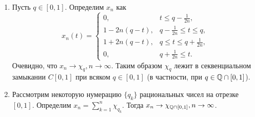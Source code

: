 \begin{solve}
\begin{enumerate}
        Покажем плотность $Q_n$ в $[0, 1]$ при каждом $n \in \N$. Пусть $Q_n$ -- не плотно. Тогда существует такой интервал $(a, b) \subset [0, 1]$, что $(a, b) \cap Q_n = \emptyset \Longleftrightarrow \forall m \in \N\colon \Int P_{m, n} \cap (a, b) = \emptyset$.

        Рассмотрим следующие множества:
        \[
            A_{m, n} = \bigcap_{k,j\geq m}\{t \in [0, 1] \mid |x_j(t) - x_k(t)| \leq \frac{1}{n}\}  .
        \]
        Заметим, что каждое $A_{m, n}$ -- замкнуто как пересечение замкнутых (которые замкнуты в силу непрерывности $x_m$). Так как $x_m \rightarrow x, m \rightarrow \infty$, то последовательность $\{x_m\}$ -- фундаментальна и $\forall t \in [0, 1] \  \exists m \in \N\colon \forall k,j \geq m \hookrightarrow |x_j(t) - x_k(t)| \leq \frac{1}{n}$. Тогда
        \[
            [0, 1] = \bigcup_{m = 1}^{\infty} A_{m, n}.
        \]
        Также, если $t \in A_{m, n}$, то в силу поточечной сходимости $\frac{1}{n} \geq |x_j(t) - x_k(t)| \rightarrow |x_j(t) - x(t)|$ при $j \geq m$, а значит $t \in P_{m, n}$. Тогда  $\Int A_{m, n} \subset \Int P_{m, n}$.

        Значит $\forall m \in \N\colon \Int A_{m, n} \cap (a, b) = \emptyset$. В частности, если $[c, d] \subset (a, b)$ и $c \neq d$, то
        \[
            [c, d] = \bigcup_{m = 1}^{\infty} A_{m, n} \cap [c, d].
        \]
        Но $A_{m, n}$ -- замкнутые множества, не имеющие внутренности в $[c, d]$, а следовательно мы получили представление полного метрического пространства в виде счётного объединения нигде не плотных множеств -- противоречие. Следовательно, каждое $Q_n$ -- всюду плотно, а следовательно и $R$ всюду плотно, что и требовалось доказать.

        \item Пусть $q \in [0, 1]$. Определим $x_n$ как
        \[
            x_n(t) =
            \begin{cases}
                0,  & t \leq q - \frac{1}{2n}, \\
                1 - 2n(q - t), & q - \frac{1}{2n} \leq t \leq q, \\
                1 + 2n(q - t), & q \leq t \leq q + \frac{1}{2n}, \\
                0, & q + \frac{1}{2n} \leq t.
            \end{cases}
        \]
        Очевидно, что $x_n \rightarrow \chi_{q}, n \rightarrow \infty$. Таким образом $\chi_{q}$ лежит в секвенциальном замыкании $C[0, 1]$ при всяком $q \in [0, 1]$ (в частности, при $q \in \mathbb{Q} \cap [0, 1]$).
        \item Рассмотрим некоторую нумерацию $\{q_k\}$ рациональных чисел на отрезке $[0, 1]$. Определим $x_n = \sum\limits_{k = 1}^n \chi_{q_k}$. Тогда $x_n \rightarrow \chi_{\mathbb{Q} \cap [0, 1]}, n \rightarrow \infty$.

    \end{enumerate}
\end{solve}
